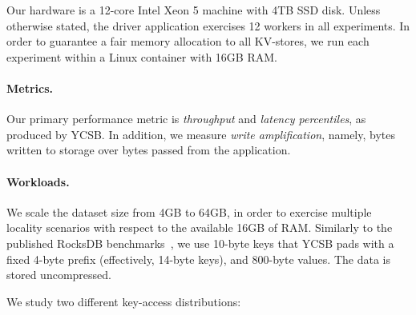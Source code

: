 Our hardware is a 12-core Intel Xeon 5 machine with 4TB SSD disk. Unless otherwise stated, the driver application 
exercises 12 workers in all experiments. In order to guarantee a fair memory allocation to all KV-stores, we run each 
experiment within a Linux container with 16GB RAM. 

\paragraph{Metrics.} Our primary performance metric is \emph{throughput} 
and \emph{latency percentiles}, as produced by YCSB. 
In addition, we measure \emph{write amplification}, namely, bytes written to storage over bytes passed from the application. 

\paragraph{Workloads.} 
We scale the dataset size from 4GB to 64GB, in order to exercise multiple locality 
scenarios with respect to the available 16GB of RAM. Similarly to the published RocksDB benchmarks~\cite{RocksDBPerf}, we use 
10-byte keys that YCSB pads with a fixed 4-byte prefix (effectively, 14-byte keys), and 800-byte values. 
The data is stored uncompressed. 

We study two different key-access distributions:  

